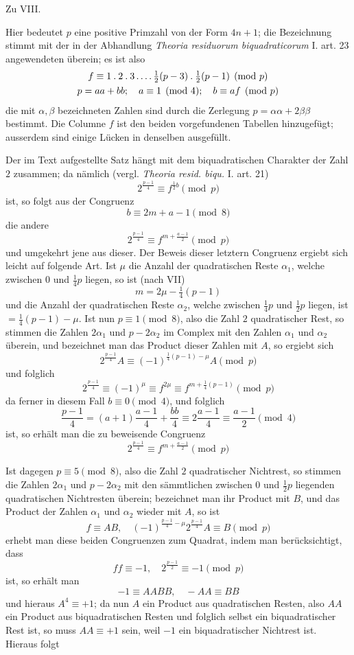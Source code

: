 \begin{center}\large Zu VIII.\end{center}

Hier bedeutet $p$ eine positive Primzahl von der Form $4n+1$; die Bezeichnung stimmt mit der in der Abhandlung \emph{Theoria residuorum biquadraticorum} I. art. 23 angewendeten überein; es ist also
\[
\begin{gathered}
f\equiv1\mathbin{.}2\mathbin{.}3\mathinner{.\,.\,.\,.}\tfrac12(p-3)\mathbin{.}\tfrac12(p-1)\pmod p\\
p=aa+bb;\quad a\equiv1\pmod4;\quad b\equiv af\pmod p
\end{gathered}
\]
die mit $\alpha,\beta$ bezeichneten Zahlen sind durch die Zerlegung $p=\alpha\alpha+2\beta\beta$ bestimmt. Die Columne $f$ ist den beiden vorgefundenen Tabellen hinzugefügt; ausserdem sind einige Lücken in denselben ausgefüllt.

Der im Text aufgestellte Satz hängt mit dem biquadratischen Charakter der Zahl $2$ zusammen; da nämlich (vergl. \emph{Theoria resid. biqu.} I. art. 21)
\[
2^{\frac{p-1}4}\equiv f^{\frac12 b}\pmod p
\]
ist, so folgt aus der Congruenz
\[
b\equiv2m+a-1\pmod8
\]
die andere
%
\[
2^{\frac{p-1}4}\equiv f^{m+\frac{a-1}2}\pmod p
\]
und umgekehrt jene aus dieser. Der Beweis dieser letztern Congruenz ergiebt sich leicht auf folgende Art. Ist $\mu$ die Anzahl der quadratischen Reste $\alpha_1$, welche zwischen $0$ und $\frac14p$ liegen, so ist (nach VII)
\[
m=2\mu-\tfrac14(p-1)
\]
und die Anzahl der quadratischen Reste $\alpha_2$, welche zwischen $\frac14p$ und $\frac12p$ liegen, ist $=\frac14(p-1)-\mu$. Ist nun $p\equiv1\pmod8$, also die Zahl $2$ quadratischer Rest, so stimmen die Zahlen $2\alpha_1$ und $p-2\alpha_2$ im Complex mit den Zahlen $\alpha_1$ und $\alpha_2$ überein, und bezeichnet man das Product dieser Zahlen mit $A$, so ergiebt sich
\[
2^{\frac{p-1}4}A\equiv(-1)^{\frac14(p-1)-\mu}A\pmod p
\]
und folglich
\[
2^{\frac{p-1}4}\equiv(-1)^\mu\equiv f^{2\mu}\equiv f^{m+\frac14(p-1)}\pmod p
\]
da ferner in diesem Fall $b\equiv0\pmod4$, und folglich
\[
\frac{p-1}4=(a+1)\frac{a-1}4+\frac{bb}4\equiv2\frac{a-1}4\equiv\frac{a-1}2\pmod4
\]
ist, so erhält man die zu beweisende Congruenz
\[
2^{\frac{p-1}4}\equiv f^{m+\frac{a-1}2}\pmod p
\]

Ist dagegen $p\equiv5\pmod8$, also die Zahl $2$ quadratischer Nichtrest, so stimmen die Zahlen $2\alpha_1$ und $p-2\alpha_2$ mit den sämmtlichen zwischen $0$ und $\frac12p$ liegenden quadratischen Nichtresten überein; bezeichnet man ihr Product mit $B$, und das Product der Zahlen $\alpha_1$ und $\alpha_2$ wieder mit $A$, so ist
\[
f\equiv AB,\quad(-1)^{\frac{p-1}4-\mu}2^{\frac{p-1}4}A\equiv B\pmod p
\]
erhebt man diese beiden Congruenzen zum Quadrat, indem man berücksichtigt, dass
\[
ff\equiv-1,\quad2^{\frac{p-1}2}\equiv-1\pmod p
\]
ist, so erhält man
\[
-1\equiv AABB,\quad-AA\equiv BB
\]
und hieraus $A^4\equiv+1$; da nun $A$ ein Product aus quadratischen Resten, also $AA$ ein Product aus biquadratischen Resten und folglich selbst ein biquadratischer Rest ist, so muss $AA\equiv+1$ sein, weil $-1$ ein biquadratischer Nichtrest ist. Hieraus folgt
